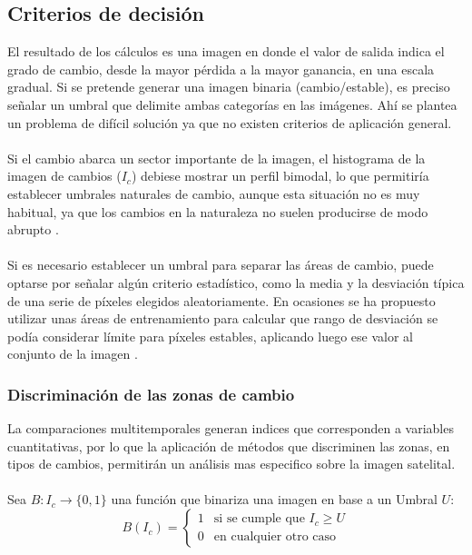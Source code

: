 \subsection{Criterios de decisi\'on}
El resultado de los c\'alculos es una imagen en donde el valor de salida indica el grado de cambio, desde la mayor p\'erdida a la mayor ganancia, en una escala gradual. Si se pretende generar una imagen binaria (cambio/estable), es preciso se\~{n}alar un umbral que delimite ambas categor\'ias en las im\'agenes. Ah\'i se plantea un problema de dif\'icil soluci\'on ya que no existen criterios de aplicación general.\\~\\
Si el cambio abarca un sector importante de la imagen, el histograma de la imagen de cambios ($ I_{c} $) debiese mostrar un perfil bimodal, lo que permitir\'ia establecer umbrales naturales de cambio, aunque esta situaci\'on no es muy habitual, ya que los cambios en la naturaleza no suelen producirse de modo abrupto \cite{martinez2013normalizacion}.\\~\\
Si es necesario establecer un umbral para separar las \'areas de cambio, puede optarse por se\~{n}alar alg\'un criterio estad\'istico, como la media y la desviaci\'on t\'ipica de una serie de p\'ixeles elegidos aleatoriamente. En ocasiones se ha propuesto utilizar unas \'areas de entrenamiento para calcular que rango de desviaci\'on se pod\'ia considerar l\'imite para p\'ixeles estables, aplicando luego ese valor al conjunto de la imagen \cite{tung1988determination}.

\subsubsection{Discriminaci\'on de las zonas de cambio}\label{sec:discriminacion}
La comparaciones multitemporales generan indices que corresponden a variables cuantitativas, por lo que la aplicaci\'on de m\'etodos que discriminen las zonas, en tipos de cambios, permitir\'an un an\'alisis mas especifico sobre la imagen satelital.\\~\\ 
Sea $ B:I_{c} \longrightarrow \{0,1\}$ 	una funci\'on que binariza una imagen en base a un Umbral $ U $:
\begin{equation}\label{ec:umbralizacion}
B(I_{c}) = \begin{cases}
1 & \text{si se cumple que } I_{c} \geq U \\
0 & \text{en cualquier otro caso}
\end{cases}
\end{equation}

